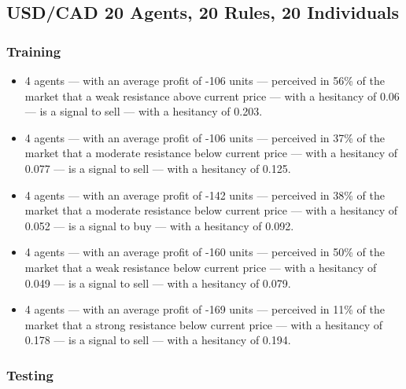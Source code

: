 \subsection{USD/CAD 20 Agents, 20 Rules, 20 Individuals}
\label{}

\subsubsection{Training}
\label{}

{\small
  \begin{itemize}
  \item 4 agents — with an average profit of -106 units — perceived in 56\% of
    the market that a weak resistance above current price — with a hesitancy
    of 0.06 — is a signal to sell — with a hesitancy of 0.203.
  \item 4 agents — with an average profit of -106 units — perceived in 37\% of the
    market that a moderate resistance below current price — with a hesitancy of
    0.077 — is a signal to sell — with a hesitancy of 0.125.
  \item 4 agents — with an average profit of -142 units — perceived in 38\% of the
    market that a moderate resistance below current price — with a hesitancy of
    0.052 — is a signal to buy — with a hesitancy of 0.092.
  \item 4 agents — with an average profit of -160 units — perceived in 50\% of the
    market that a weak resistance below current price — with a hesitancy of 0.049
    — is a signal to sell — with a hesitancy of 0.079.
  \item 4 agents — with an average profit of -169 units — perceived in 11\% of the
    market that a strong resistance below current price — with a hesitancy of
    0.178 — is a signal to sell — with a hesitancy of 0.194.
  \end{itemize}
}

\subsubsection{Testing}
\label{}

